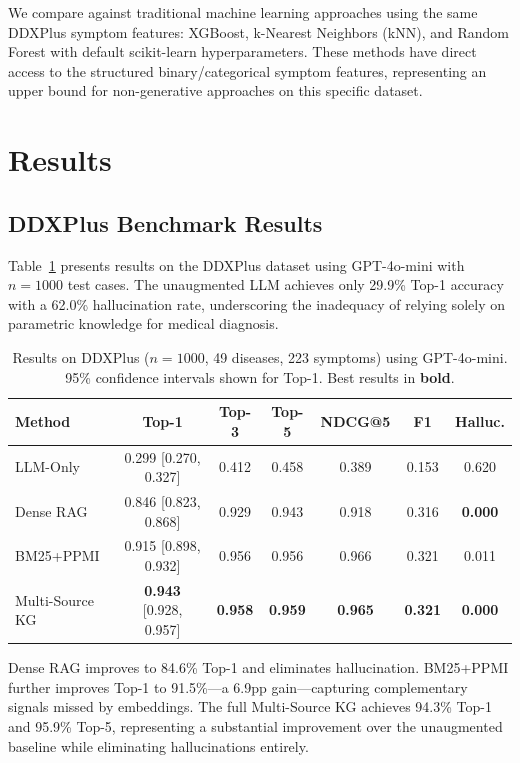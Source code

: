 \documentclass[preprint,12pt]{elsarticle}
\begin{document}
We compare against traditional machine learning approaches using the same DDXPlus symptom features: XGBoost, k-Nearest Neighbors (kNN), and Random Forest with default scikit-learn hyperparameters. These methods have direct access to the structured binary/categorical symptom features, representing an upper bound for non-generative approaches on this specific dataset.

\section{Results}
\label{sec:results}

\subsection{DDXPlus Benchmark Results}

Table~\ref{tab:ddxplus} presents results on the DDXPlus dataset using GPT-4o-mini with $n{=}1000$ test cases. The unaugmented LLM achieves only 29.9\% Top-1 accuracy with a 62.0\% hallucination rate, underscoring the inadequacy of relying solely on parametric knowledge for medical diagnosis.

\begin{table}[t]
\centering
\caption{Results on DDXPlus ($n{=}1000$, 49 diseases, 223 symptoms) using GPT-4o-mini. 95\% confidence intervals shown for Top-1. Best results in \textbf{bold}.}
\label{tab:ddxplus}
\begin{tabular}{lcccccc}
\toprule
\textbf{Method} & \textbf{Top-1} & \textbf{Top-3} & \textbf{Top-5} & \textbf{NDCG@5} & \textbf{F1} & \textbf{Halluc.} \\
\midrule
LLM-Only       & 0.299 [0.270, 0.327] & 0.412 & 0.458 & 0.389 & 0.153 & 0.620 \\
Dense RAG       & 0.846 [0.823, 0.868] & 0.929 & 0.943 & 0.918 & 0.316 & \textbf{0.000} \\
BM25+PPMI       & 0.915 [0.898, 0.932] & 0.956 & 0.956 & 0.966 & 0.321 & 0.011 \\
Multi-Source KG & \textbf{0.943} [0.928, 0.957] & \textbf{0.958} & \textbf{0.959} & \textbf{0.965} & \textbf{0.321} & \textbf{0.000} \\
\bottomrule
\end{tabular}
\end{table}

Dense RAG improves to 84.6\% Top-1 and eliminates hallucination. BM25+PPMI further improves Top-1 to 91.5\%---a 6.9pp gain---capturing complementary signals missed by embeddings. The full Multi-Source KG achieves 94.3\% Top-1 and 95.9\% Top-5, representing a substantial improvement over the unaugmented baseline while eliminating hallucinations entirely.
\end{document}
